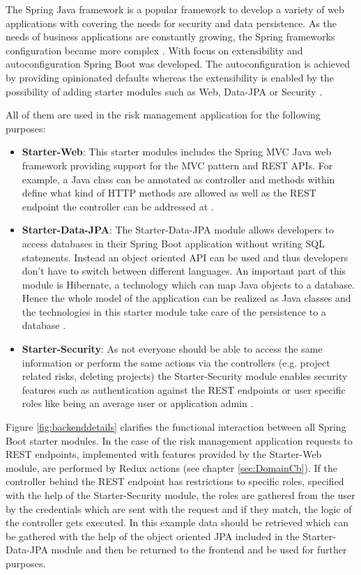 The Spring Java framework is a popular framework to develop a variety of web applications with covering the needs for security and data persistence. As the needs of business applications are constantly growing, the Spring frameworks configuration became more complex \cite[p. 1]{prasadreddyBeginningSpringBoot2017}. With focus on extensibility and autoconfiguration Spring Boot was developed. The autoconfiguration is achieved by providing opinionated defaults whereas the extensibility is enabled by the possibility of adding starter modules such as Web, Data-\ac{JPA}  or Security \cite[p. 21-22]{prasadreddyBeginningSpringBoot2017}. 

All of them are used in the risk management application for the following purposes:

\begin{itemize}
	\item \textbf{Starter-Web}: This starter modules includes the Spring \ac{MVC} Java web framework providing support for the \ac{MVC} pattern and \ac{REST} \ac{API}s. For example, a Java class can be annotated as controller and methods within define what kind of \ac{HTTP} methods are allowed as well as the \ac{REST} endpoint the controller can be addressed at \cite[p. 107-109]{prasadreddyBeginningSpringBoot2017}. 
	\item \textbf{Starter-Data-\ac{JPA}}: The Starter-Data-JPA module allows developers to access databases in their Spring Boot application without writing \acs{SQL} statements. Instead an object oriented \ac{API} can be used and thus developers don’t have to switch between different languages. An important part of this module is Hibernate, a technology which can map Java objects to a database. Hence the whole model of the application can be realized as Java classes and the technologies in this starter module take care of the persistence to a database \cite[p. 83]{prasadreddyBeginningSpringBoot2017}. 
	\item \textbf{Starter-Security}: As not everyone should be able to access the same information or perform the same actions via the controllers (e.g. project related risks, deleting projects) the Starter-Security module enables security features such as authentication against the \ac{REST} endpoints or user specific roles like being an average user or application admin \cite[p. 176-176]{prasadreddyBeginningSpringBoot2017}. 
\end{itemize}

Figure \ref{fig:backenddetails} clarifies the functional interaction between all Spring Boot starter modules. In the case of the risk management application requests to \ac{REST} endpoints, implemented with features provided by the Starter-Web module, are performed by Redux actions (see chapter \ref{sec:DomainCb}). If the controller behind the \ac{REST} endpoint has restrictions to specific roles, specified with the help of the Starter-Security module, the roles are gathered from the user by the credentials which are sent with the request and if they match, the logic of the controller gets executed. In this example data should be retrieved which can be gathered with the help of the object oriented JPA included in the Starter-Data-\ac{JPA} module and then be returned to the frontend and be used for further purposes. 

